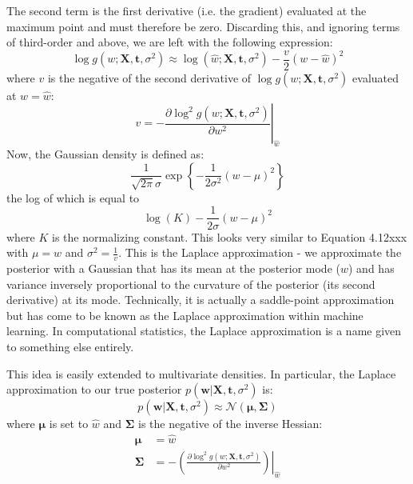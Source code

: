 The second term is the first derivative (i.e. the gradient) evaluated at the maximum
point and must therefore be zero. Discarding this, and ignoring terms of third-order
and above, we are left with the following expression:
\begin{equation}
\log g(w; \mathbf{X}, \mathbf{t}, \sigma^2) \approx
\log(\widehat{w}; \mathbf{X}, \mathbf{t}, \sigma^2) - \frac{v}{2}(w - \widehat{w})^2
\end{equation}
where $v$ is the negative of the second derivative of $\log g(w; \mathbf{X}, \mathbf{t}, \sigma^2)$
evaluated at $w = \widehat{w}$:
\begin{equation*}
v = -\left. \frac{\partial \log^2 g(w; \mathbf{X}, \mathbf{t}, \sigma^2)}{\partial w^2} \right|_{\widehat{w}}
\end{equation*}
Now, the Gaussian density is defined as:
\begin{equation*}
\frac{1}{\sqrt{2\pi}\sigma} \exp\left\{
-\frac{1}{2\sigma^2} (w - \mu)^2 \right\}
\end{equation*}
the log of which is equal to
\begin{equation*}
\log(K) - \frac{1}{2\sigma} (w - \mu)^2
\end{equation*}
where $K$ is the normalizing constant. This looks very similar to Equation 4.12xxx
with $\mu = w$ and $\sigma^2 = \frac{1}{v}$.
This is the Laplace approximation - we approximate the posterior
with a Gaussian that has its mean at the posterior mode ($w$) and has variance
inversely proportional to the curvature of the posterior (its second derivative) at its
mode.
Technically, it is actually a saddle-point approximation but has come to be known as the
Laplace approximation within machine learning. In computational statistics, the Laplace
approximation is a name given to something else entirely.

This idea is easily extended to multivariate densities. In particular, the Laplace
approximation to our true posterior $p(\mathbf{w} | \mathbf{X}, \mathbf{t}, \sigma^2)$
is:
\begin{equation*}
p(\mathbf{w} | \mathbf{X}, \mathbf{t}, \sigma^2) \approx
\mathcal{N}(\boldsymbol{\mu}, \boldsymbol{\Sigma})
\end{equation*}
where $\boldsymbol{\mu}$ is set to $\widehat{w}$ and $\boldsymbol{\Sigma}$ is the
negative of the inverse Hessian:
\begin{align}
\boldsymbol{\mu} & = \widehat{w} \\
\boldsymbol{\Sigma} & =
-\left. \left( \frac{\partial \log^2 g(w; \mathbf{X}, \mathbf{t}, \sigma^2)}{\partial w^2}
\right)
\right|_{\widehat{w}}
\end{align}


